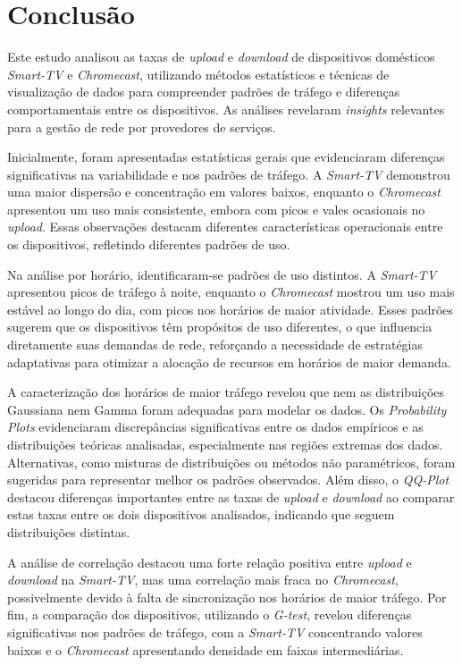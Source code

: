 \section{Conclusão}

Este estudo analisou as taxas de \textit{upload} e \textit{download} de dispositivos domésticos \textit{Smart-TV} e \textit{Chromecast}, utilizando métodos estatísticos e técnicas de visualização de dados para compreender padrões de tráfego e diferenças comportamentais entre os dispositivos. As análises revelaram \textit{insights} relevantes para a gestão de rede por provedores de serviços.

Inicialmente, foram apresentadas estatísticas gerais que evidenciaram diferenças significativas na variabilidade e nos padrões de tráfego. A \textit{Smart-TV} demonstrou uma maior dispersão e concentração em valores baixos, enquanto o \textit{Chromecast} apresentou um uso mais consistente, embora com picos e vales ocasionais no \textit{upload}. Essas observações destacam diferentes características operacionais entre os dispositivos, refletindo diferentes padrões de uso.

Na análise por horário, identificaram-se padrões de uso distintos. A \textit{Smart-TV} apresentou picos de tráfego à noite, enquanto o \textit{Chromecast} mostrou um uso mais estável ao longo do dia, com picos nos horários de maior atividade. Esses padrões sugerem que os dispositivos têm propósitos de uso diferentes, o que influencia diretamente suas demandas de rede, reforçando a necessidade de estratégias adaptativas para otimizar a alocação de recursos em horários de maior demanda.

A caracterização dos horários de maior tráfego revelou que nem as distribuições Gaussiana nem Gamma foram adequadas para modelar os dados. Os \textit{Probability Plots} evidenciaram discrepâncias significativas entre os dados empíricos e as distribuições teóricas analisadas, especialmente nas regiões extremas dos dados. Alternativas, como misturas de distribuições ou métodos não paramétricos, foram sugeridas para representar melhor os padrões observados. Além disso, o \textit{QQ-Plot} destacou diferenças importantes entre as taxas de \textit{upload} e \textit{download} ao comparar estas taxas entre os dois dispositivos analisados, indicando que seguem distribuições distintas.

A análise de correlação destacou uma forte relação positiva entre \textit{upload} e \textit{download} na \textit{Smart-TV}, mas uma correlação mais fraca no \textit{Chromecast}, possivelmente devido à falta de sincronização nos horários de maior tráfego. Por fim, a comparação dos dispositivos, utilizando o \textit{G-test}, revelou diferenças significativas nos padrões de tráfego, com a \textit{Smart-TV} concentrando valores baixos e o \textit{Chromecast} apresentando densidade em faixas intermediárias.


